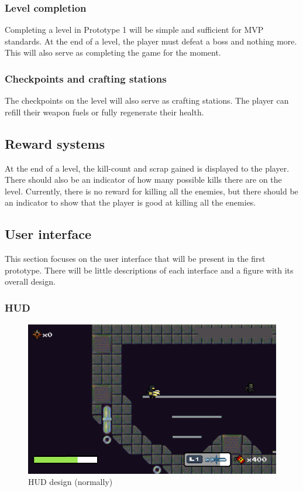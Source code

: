 \documentclass[../Main.tex]{subfiles}
\begin{document}
\subsubsection{Level completion}

Completing a level in Prototype 1 will be simple and sufficient for MVP standards. At the end of a level, the player must defeat a boss and nothing more. This will also serve as completing the game for the moment. 

\subsubsection{Checkpoints and crafting stations}

The checkpoints on the level will also serve as crafting stations. The player can refill their weapon fuels or fully regenerate their health.

\subsection{Reward systems}

At the end of a level, the kill-count and scrap gained is displayed to the player. There should also be an indicator of how many possible kills there are on the level. Currently, there is no reward for killing all the enemies, but there should be an indicator to show that the player is good at killing all the enemies. 

\subsection{User interface}

This section focuses on the user interface that will be present in the first prototype. There will be little descriptions of each interface and a figure with its overall design.

\subsubsection{HUD}

\begin{figure}[H]
	\centering
	\includegraphics[width=\columnwidth]{Figures/HUD.png}
	\caption{HUD design (normally)}
\end{figure}
\end{document}
